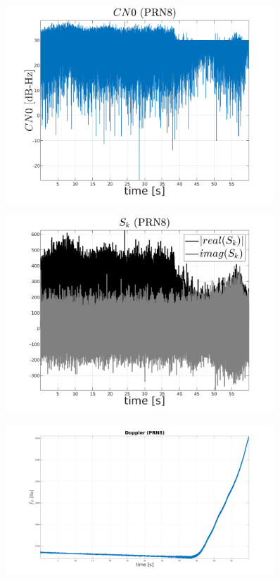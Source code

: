 \begin{figure}[H]
	\centering
	\includegraphics[width=0.9\textwidth]{fig/CN0_PRN8.png}
\end{figure}

\begin{figure}[H]
	\centering
	\includegraphics[width=0.9\textwidth]{fig/sk_PRN8.png}
\end{figure}

\begin{figure}[H]
	\centering
	\includegraphics[width=0.9\textwidth]{fig/doppler_PRN8.png}
\end{figure}

